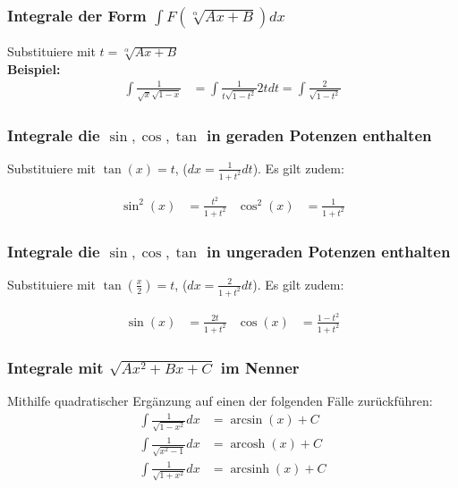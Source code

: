 \documentclass[25pt]{sciposter}
\begin{document}
\begin{multicols}{3}
		\subsubsection*{Integrale der Form $\int F(\sqrt[\alpha]{Ax + B}) dx$}
		Substituiere mit $t = \sqrt[\alpha]{Ax + B}$\\
		\textbf{Beispiel:}
		\begin{align*}
			\int \frac{1}{\sqrt{x} \sqrt{1-x}} &= \int \frac{1}{t \sqrt{1-t^2}} 2t dt = \int \frac{2}{\sqrt{1-t^2}}
		\end{align*}
		
		\subsubsection*{Integrale die $\sin, \cos, \tan$ in geraden Potenzen enthalten}
		Substituiere mit $\tan(x) = t$, ($dx = \frac{1}{1+t^2} dt$). Es gilt zudem:
		
		\begin{align*}
			\sin^2(x) &= \frac{t^2}{1+t^2} & \cos^2(x) &= \frac{1}{1+t^2}
		\end{align*}
		
		\subsubsection*{Integrale die $\sin, \cos, \tan$ in ungeraden Potenzen enthalten}
		Substituiere mit $\tan(\frac{x}{2}) = t$, ($dx = \frac{2}{1+t^2} dt$). Es gilt zudem:
		
		\begin{align*}
			\sin(x) &= \frac{2t}{1+t^2} & \cos(x) &= \frac{1-t^2}{1+t^2}
		\end{align*}
		
		
		
		\subsubsection*{Integrale mit $\sqrt{Ax^2 + Bx + C}$ im Nenner}
		Mithilfe quadratischer Ergänzung auf einen der folgenden Fälle zurückführen:
		\begin{align*}
			\int \frac{1}{\sqrt{1-x^2}} dx &= \arcsin(x) + C\\
			\int \frac{1}{\sqrt{x^2-1}} dx &= \operatorname{arcosh}(x) + C\\
			\int \frac{1}{\sqrt{1+x^2}} dx &= \operatorname{arcsinh}(x) + C
		\end{align*}
		
		
		

\end{multicols}
\end{document}
